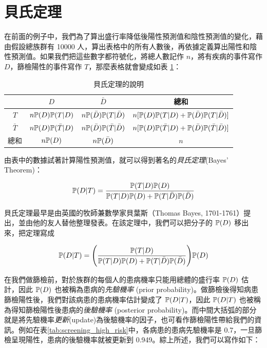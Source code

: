     \answerbox{240pt}

\section{貝氏定理}
    在前面的例子中，我們為了算出盛行率降低後陽性預測值和陰性預測值的變化，藉由假設總族群有 10000 人，算出表格中的所有人數後，再依據定義算出陽性和陰性預測值。如果我們把這些數字都符號化，將總人數記作 $n$，將有疾病的事件寫作 $D$，篩檢陽性的事件寫作 $T$，那麼表格就會變成如表 \ref{tab:Bayes}：

    \begin{table}[htbp]
        \begin{center}
            \begin{tabular}{c|cc|c}
                \toprule
                 & $D$ & $\bar{D}$ & 總和\\
                \hline
                $T$ & $n\mathbb{P}(D)\mathbb{P}(T|D)$ & $n\mathbb{P}(\bar{D})\mathbb{P}(T|\bar{D})$ & $n[\mathbb{P}(D)\mathbb{P}(T|D) + \mathbb{P}(\bar{D})\mathbb{P}(T|\bar{D})]$\\
                $\bar{T}$ & $n\mathbb{P}(D)\mathbb{P}(\bar{T}|D)$  & $n\mathbb{P}(\bar{D})\mathbb{P}(\bar{T}|\bar{D})$ & $n[\mathbb{P}(D)\mathbb{P}(\bar{T}|D) + \mathbb{P}(\bar{D})\mathbb{P}(\bar{T}|\bar{D})]$\\
                \hline
                總和 & $n\mathbb{P}(D)$ & $n\mathbb{P}(\bar{D})$ & $n$\\
                \bottomrule
            \end{tabular}
            \caption{貝氏定理的說明\label{tab:Bayes}}
        \end{center}
    \end{table}
    
    由表中的數據試著計算陽性預測值，就可以得到著名的\textit{貝氏定理}(Bayes' Theorem)：
    
    \[\mathbb{P}(D|T) = \frac{\mathbb{P}(T|D)\mathbb{P}(D)}{\mathbb{P}(T|D)\mathbb{P}(D) + \mathbb{P}(T|\bar{D})\mathbb{P}(\bar{D})}\]
    
    \noindent 貝氏定理最早是由英國的牧師兼數學家貝葉斯（Thomas Bayes, 1701-1761）提出，並由他的友人替他整理發表。在該定理中，我們可以把分子的 $\mathbb{P}(D)$ 移出來，把定理寫成
    
    \[\mathbb{P}(D|T) = \Bigg(\frac{\mathbb{P}(T|D)}{\mathbb{P}(T|D)\mathbb{P}(D) + \mathbb{P}(T|\bar{D})\mathbb{P}(\bar{D})}\Bigg) \mathbb{P}(D)\]
    
    \noindent 在我們做篩檢前，對於族群的每個人的患病機率只能用總體的盛行率 $\mathbb{P}(D)$ 估計，因此 $\mathbb{P}(D)$ 也被稱為患病的\textit{先驗機率} (prior probability)。做篩檢後得知病患篩檢陽性後，我們對該病患的患病機率估計變成了 $\mathbb{P}(D|T)$，因此 $\mathbb{P}(D|T)$ 也被稱為得知篩檢陽性後患病的\textit{後驗機率} (posterior probability)。而中間大括弧的部分就是將先驗機率\textit{更新}(update)為後驗機率的因子，也可看作篩檢陽性帶給我們的資訊。例如在表\ref{tab:screening_high_risk}中，各病患的患病先驗機率是 0.7，一旦篩檢呈現陽性，患病的後驗機率就被更新到 0.949。綜上所述，我們可以寫作如下：
    
